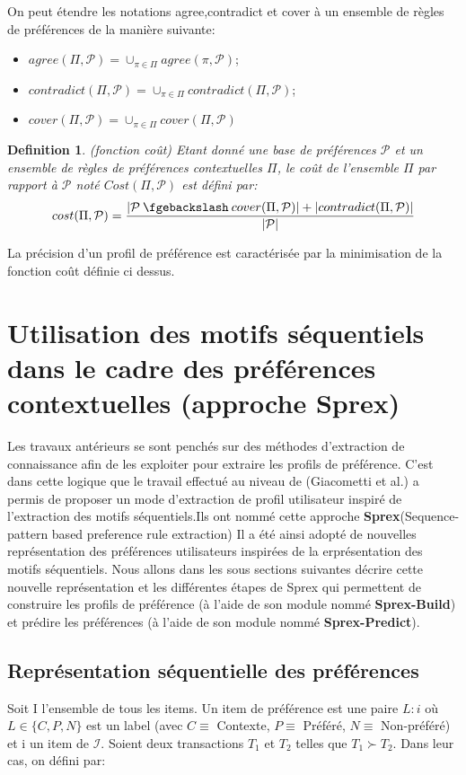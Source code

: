 \documentclass[a4paper,12pt,openany,oneside]{article}
\newcommand{\mysetminus}{\mathbin{\fgebackslash}}
\newtheorem{defn}{Definition} %
\begin{document}
	On peut étendre les notations agree,contradict et cover à un ensemble de règles de préférences de la manière suivante:\\
	\begin{itemize}
		\item $agree(\Pi,\mathcal{P})=\cup_{\pi \in \Pi} agree(\pi,\mathcal{P})$;
		\item $contradict(\Pi,\mathcal{P}) =\cup_{\pi\in\Pi}contradict(\Pi,\mathcal{P})$;
		\item $cover(\Pi,\mathcal{P})=\cup_{\pi\in\Pi}cover(\Pi,\mathcal{P})$\\
	\end{itemize}


\begin{defn}(fonction coût)
Etant donné une base de préférences $\mathcal{P}$ et un ensemble de règles de préférences contextuelles $\Pi$, le coût de l'ensemble $\Pi$ par rapport à $\mathcal{P}$ noté $Cost(\Pi,\mathcal{P})$ est défini par:
\[
cost(\Pi,\mathcal{P})=\frac{|\mathcal{P}\mysetminus cover(\Pi,\mathcal{P})|+|contradict(\Pi,\mathcal{P})|}{|\mathcal{P}|}
\]
\end{defn}
La précision d'un profil de préférence est caractérisée par la minimisation de la fonction coût définie ci dessus.

\section{Utilisation des motifs séquentiels dans le cadre des préférences contextuelles (approche Sprex)}

Les travaux antérieurs se sont penchés sur des méthodes d'extraction de connaissance afin de les exploiter pour extraire les profils de préférence.
C'est dans cette logique que le travail effectué au niveau de (Giacometti et al.) a permis de proposer un mode d'extraction de profil utilisateur inspiré de l'extraction des motifs séquentiels.Ils ont nommé cette approche \textbf{Sprex}(Sequence-pattern based preference rule extraction)
Il a été ainsi adopté de nouvelles représentation des préférences utilisateurs inspirées de la erprésentation des motifs séquentiels.
Nous allons dans les sous sections suivantes décrire cette nouvelle représentation et les différentes étapes de Sprex qui permettent de construire les profils de préférence (à l'aide de son module nommé \textbf{Sprex-Build}) et prédire les préférences (à l'aide de son module nommé \textbf{Sprex-Predict}). 

\subsection{Représentation séquentielle des préférences}
Soit I l'ensemble de tous les items. Un item de préférence est une paire $L:i$ où $L\in \{C,P,N\}$ est un label (avec $C\equiv $ Contexte, $P\equiv $ Préféré, $N\equiv $ Non-préféré) et i un item de $\mathcal{I}$.
Soient deux transactions $T_1$ et $T_2$ telles que $T_1\succ T_2$. Dans leur cas, on défini par:
\end{document}
